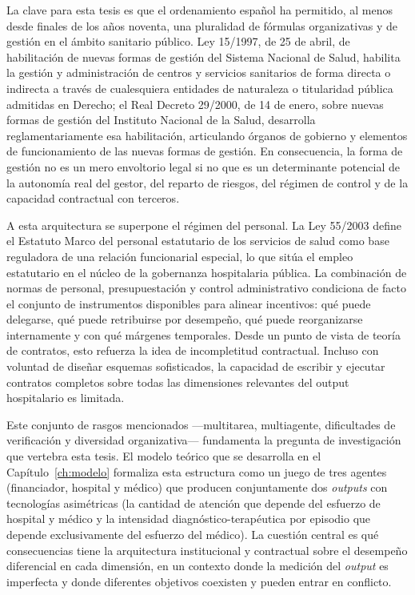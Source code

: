 La clave para esta tesis es que el ordenamiento español ha permitido, al menos desde finales de los años noventa, una pluralidad de fórmulas organizativas y de gestión en el ámbito sanitario público. Ley 15/1997, de 25 de abril, de habilitación de nuevas formas de gestión del Sistema Nacional de Salud, habilita la gestión y administración de centros y servicios sanitarios de forma directa o indirecta a través de cualesquiera entidades de naturaleza o titularidad pública admitidas en Derecho; el Real Decreto 29/2000, de 14 de enero, sobre nuevas formas de gestión del Instituto Nacional de la Salud, desarrolla reglamentariamente esa habilitación, articulando órganos de gobierno y elementos de funcionamiento de las nuevas formas de gestión. En consecuencia, la forma de gestión no es un mero envoltorio legal si no que es un determinante potencial de la autonomía real del gestor, del reparto de riesgos, del régimen de control y de la capacidad contractual con terceros.

A esta arquitectura se superpone el régimen del personal. La Ley 55/2003 define el Estatuto Marco del personal estatutario de los servicios de salud como base reguladora de una relación funcionarial especial, lo que sitúa el empleo estatutario en el núcleo de la gobernanza hospitalaria pública. La combinación de normas de personal, presupuestación y control administrativo condiciona de facto el conjunto de instrumentos disponibles para alinear incentivos: qué puede delegarse, qué puede retribuirse por desempeño, qué puede reorganizarse internamente y con qué márgenes temporales. Desde un punto de vista de teoría de contratos, esto refuerza la idea de incompletitud contractual. Incluso con voluntad de diseñar esquemas sofisticados, la capacidad de escribir y ejecutar contratos completos sobre todas las dimensiones relevantes del output hospitalario es limitada.

Este conjunto de rasgos mencionados ---multitarea, multiagente, dificultades de verificación y diversidad organizativa--- fundamenta la pregunta de investigación que vertebra esta tesis. El modelo teórico que se desarrolla en el Capítulo~\ref{ch:modelo} formaliza esta estructura como un juego de tres agentes  (financiador, hospital y médico) que producen conjuntamente dos \textit{outputs} con tecnologías asimétricas (la cantidad de atención que depende del esfuerzo de hospital y médico y la intensidad diagnóstico-terapéutica por episodio que depende exclusivamente del esfuerzo del médico). La cuestión central es qué consecuencias tiene la arquitectura institucional y contractual sobre el desempeño diferencial en cada dimensión, en un contexto donde la medición del \textit{output} es imperfecta y donde diferentes objetivos coexisten y pueden entrar en conflicto.

